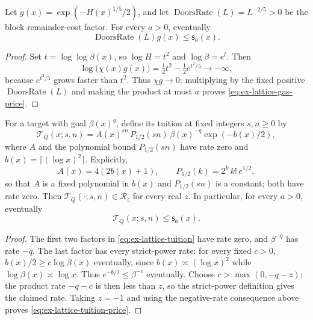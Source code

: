 \begin{lemma}
\label{lem:ex-lattice-medal-gas-price}
Let \(g(x)=\exp(-H(x)^{1/5}/2)\), and let
\(\operatorname{DoorsRate}(L)=L^{-2/5}>0\) be the block remainder-cost
factor. For every \(a>0\), eventually
\begin{equation}
                    \operatorname{DoorsRate}(L)g(x)\le\mathsf s_a(x).
 \label{eq:ex-lattice-gas-price}
\end{equation}
\end{lemma}
\begin{proof}
Set \(t=\log\log\beta(x)\), so \(\log H=t^2\) and
\(\log\beta=e^t\). Then
\[
\log\bigl(\chi(x)g(x)\bigr)=\tfrac12t^2-\tfrac12e^{t^2/5}\longrightarrow-\infty,
\]
because \(e^{t^2/5}\) grows faster than \(t^2\). Thus
\(\chi g\to0\); multiplying by the fixed positive \(\operatorname{DoorsRate}(L)\)
and making the product at most \(a\) proves \eqref{eq:ex-lattice-gas-price}.
\end{proof}

\begin{lemma}
\label{lem:ex-lattice-medal-tuition-price}
For a target with goal \(\beta(x)^q\), define its tuition at fixed integers
\(s,n\ge0\) by
\begin{equation}
 \mathcal T_Q(x;s,n)=A(x)^{sn}\,P_{1/2}(sn)\,\beta(x)^{-q}
                         \exp(-b(x)/2),
 \label{eq:ex-lattice-tuition}
\end{equation}
where \(A\) and the polynomial bound \(P_{1/2}(sn)\) have rate zero and
\(b(x)=\lceil(\log x)^2\rceil\). Explicitly,
\[
 A(x)=4(2b(x)+1),\qquad P_{1/2}(k)=2^k\,k!\,e^{1/2},
\]
so that \(A\) is a fixed polynomial in \(b(x)\) and \(P_{1/2}(sn)\) is a
constant; both have rate zero. Then
\(\mathcal T_Q(\cdot;s,n)\in\mathcal R_z\) for every real \(z\). In
particular, for every \(a>0\), eventually
\begin{equation}
                       \mathcal T_Q(x;s,n)\le\mathsf s_a(x).
 \label{eq:ex-lattice-tuition-price}
\end{equation}
\end{lemma}
\begin{proof}
The first two factors in \eqref{eq:ex-lattice-tuition} have rate zero, and \(\beta^{-q}\) has rate
\(-q\). The last factor has every strict-power rate: for every fixed
\(c>0\), \(b(x)/2\ge c\log\beta(x)\) eventually, since
\(b(x)\asymp(\log x)^2\) while \(\log\beta(x)\asymp\log x\). Thus
\(e^{-b/2}\le\beta^{-c}\) eventually. Choose
\(c>\max(0,-q-z)\); the product rate \(-q-c\) is then less than \(z\),
so the strict-power definition gives the claimed rate. Taking \(z=-1\) and using the negative-rate consequence
above proves \eqref{eq:ex-lattice-tuition-price}.
\end{proof}

